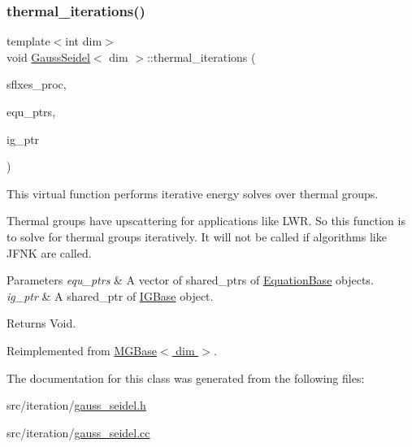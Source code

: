 \subsubsection{\texorpdfstring{thermal\+\_\+iterations()}{thermal\_iterations()}}
{\footnotesize\ttfamily template$<$int dim$>$ \\
void \hyperlink{class_gauss_seidel}{Gauss\+Seidel}$<$ dim $>$\+::thermal\+\_\+iterations (\begin{DoxyParamCaption}\item[{std\+::vector$<$ Vector$<$ double $>$ $>$ \&}]{sflxes\+\_\+proc,  }\item[{std\+::vector$<$ std\+\_\+cxx11\+::shared\+\_\+ptr$<$ \hyperlink{class_equation_base}{Equation\+Base}$<$ dim $>$ $>$ $>$ \&}]{equ\+\_\+ptrs,  }\item[{std\+\_\+cxx11\+::shared\+\_\+ptr$<$ \hyperlink{class_i_g_base}{I\+G\+Base}$<$ dim $>$ $>$}]{ig\+\_\+ptr }\end{DoxyParamCaption})\hspace{0.3cm}{\ttfamily [virtual]}}

This virtual function performs iterative energy solves over thermal groups.

Thermal groups have upscattering for applications like L\+WR. So this function is to solve for thermal groups iteratively. It will not be called if algorithms like J\+F\+NK are called.


\begin{DoxyParams}{Parameters}
{\em equ\+\_\+ptrs} & A vector of shared\+\_\+ptr\textquotesingle{}s of \hyperlink{class_equation_base}{Equation\+Base} objects. \\
\hline
{\em ig\+\_\+ptr} & A shared\+\_\+ptr of \hyperlink{class_i_g_base}{I\+G\+Base} object. \\
\hline
\end{DoxyParams}
\begin{DoxyReturn}{Returns}
Void. 
\end{DoxyReturn}


Reimplemented from \hyperlink{class_m_g_base_a9d3c6ab6e58f0119badb30feedb2ac4d}{M\+G\+Base$<$ dim $>$}.



The documentation for this class was generated from the following files\+:\begin{DoxyCompactItemize}
\item 
src/iteration/\hyperlink{gauss__seidel_8h}{gauss\+\_\+seidel.\+h}\item 
src/iteration/\hyperlink{gauss__seidel_8cc}{gauss\+\_\+seidel.\+cc}\end{DoxyCompactItemize}
